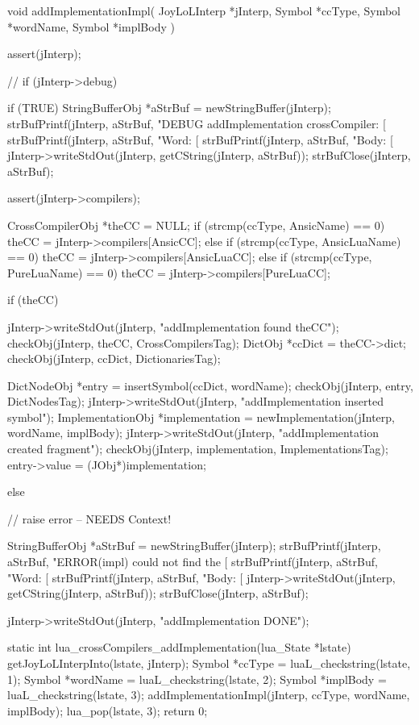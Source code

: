 \startCCode
void addImplementationImpl(
  JoyLoLInterp *jInterp,
  Symbol       *ccType,
  Symbol       *wordName,
  Symbol       *implBody
) {
  assert(jInterp);
  
//  if (jInterp->debug) {
  if (TRUE) {
    StringBufferObj *aStrBuf = newStringBuffer(jInterp);
    strBufPrintf(jInterp, aStrBuf, 
      "DEBUG addImplementation crossCompiler: [%
    strBufPrintf(jInterp, aStrBuf, "Word: [%
    strBufPrintf(jInterp, aStrBuf, "Body: [%
    jInterp->writeStdOut(jInterp, getCString(jInterp, aStrBuf));
    strBufClose(jInterp, aStrBuf);
  }
  
  assert(jInterp->compilers);

  CrossCompilerObj *theCC = NULL;
  if (strcmp(ccType, AnsicName) == 0) {
    theCC = jInterp->compilers[AnsicCC];
  } else if (strcmp(ccType, AnsicLuaName) == 0) {
    theCC = jInterp->compilers[AnsicLuaCC];
  } else if (strcmp(ccType, PureLuaName) == 0) {
    theCC = jInterp->compilers[PureLuaCC];
  }
  
  if (theCC) {
    jInterp->writeStdOut(jInterp, "addImplementation found theCC\n");
    checkObj(jInterp, theCC, CrossCompilersTag);
    DictObj *ccDict = theCC->dict;
    checkObj(jInterp, ccDict, DictionariesTag);
    
    DictNodeObj *entry    = insertSymbol(ccDict, wordName);
    checkObj(jInterp, entry, DictNodesTag);
    jInterp->writeStdOut(jInterp, "addImplementation inserted symbol\n");
    ImplementationObj *implementation =
      newImplementation(jInterp, wordName, implBody);
    jInterp->writeStdOut(jInterp, "addImplementation created fragment\n");
    checkObj(jInterp, implementation, ImplementationsTag);
    entry->value = (JObj*)implementation;
  } else {
    // raise error -- NEEDS Context!
    
    StringBufferObj *aStrBuf = newStringBuffer(jInterp);
    strBufPrintf(jInterp, aStrBuf, 
      "ERROR(impl) could not find the [%
    strBufPrintf(jInterp, aStrBuf, "Word: [%
    strBufPrintf(jInterp, aStrBuf, "Body: [%
    jInterp->writeStdOut(jInterp, getCString(jInterp, aStrBuf));
    strBufClose(jInterp, aStrBuf);
  }
  jInterp->writeStdOut(jInterp, "addImplementation DONE\n");
}

static int lua_crossCompilers_addImplementation(lua_State *lstate) {
  getJoyLoLInterpInto(lstate, jInterp);
  Symbol *ccType   = luaL_checkstring(lstate, 1);
  Symbol *wordName = luaL_checkstring(lstate, 2);
  Symbol *implBody = luaL_checkstring(lstate, 3);
  addImplementationImpl(jInterp, ccType, wordName, implBody);
  lua_pop(lstate, 3);
  return 0;
}
\stopCCode
\stopTestSuite

}
